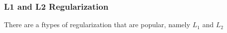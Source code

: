 \subsubsection{L1 and L2 Regularization}

There are a ftypes of regularization that are popular, namely $L_1$ and $L_2$